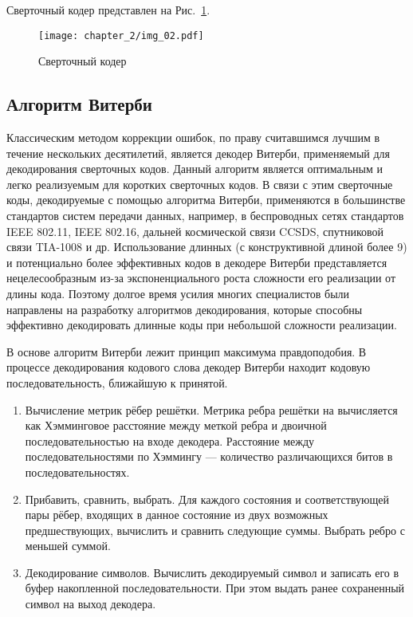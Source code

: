 Сверточный кодер представлен на Рис.~\ref{img_02}.

\begin{figure}[htbp]
\begin{center}
\texttt{[image: chapter\_2/img\_02.pdf]}
\end{center}
\caption{Сверточный кодер}
\label{img_02}
\end{figure}

\subsection{Алгоритм Витерби}
Классическим методом коррекции ошибок, по праву считавшимся лучшим в течение нескольких десятилетий, является 
декодер Витерби, применяемый для декодирования сверточных кодов. Данный алгоритм является оптимальным и легко 
реализуемым для коротких сверточных кодов. В связи с этим сверточные коды, декодируемые с помощью алгоритма 
Витерби, применяются в большинстве стандартов систем передачи данных, например, в беспроводных сетях 
стандартов IEEE 802.11, IEEE 802.16, дальней космической связи CCSDS, спутниковой связи TIA-1008 и др. 
Использование длинных (с конструктивной длиной более 9) и потенциально более эффективных кодов в декодере 
Витерби представляется нецелесообразным из-за экспоненциального роста сложности его реализации от длины кода. 
Поэтому долгое время усилия многих специалистов были направлены на разработку алгоритмов декодирования, 
которые способны эффективно декодировать длинные коды при небольшой сложности реализации.

В основе алгоритм Витерби лежит принцип максимума правдоподобия. В процессе декодирования кодового слова
декодер Витерби находит кодовую последовательность, ближайшую к принятой. 

\begin{enumerate}
\item Вычисление метрик рёбер решётки. Метрика ребра решётки на вычисляется как Хэмминговое расстояние
между меткой ребра и двоичной последовательностью на входе декодера. Расстояние между последовательностями
по Хэммингу --- количество различающихся битов в последовательностях.
\item Прибавить, сравнить, выбрать.
Для каждого состояния и соответствующей пары рёбер, входящих в данное состояние из двух возможных
предшествующих, вычислить и сравнить следующие суммы. Выбрать ребро с меньшей суммой.
\item Декодирование символов.
Вычислить декодируемый символ и записать его в буфер накопленной последовательности. При этом выдать
ранее сохраненный символ на выход декодера.
\end{enumerate}

